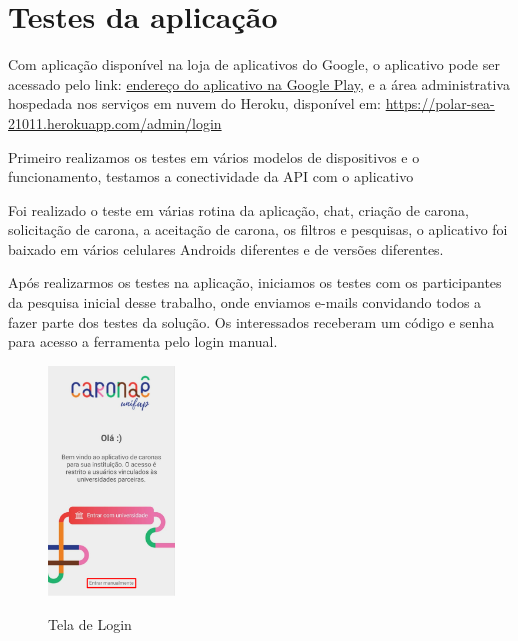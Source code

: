 
\section{Testes da aplicação}
Com aplicação disponível na loja de aplicativos do Google, o aplicativo pode ser acessado pelo link: \href{https://play.google.com/store/apps/details?id=com.unifap.caronaeunifap}{endereço do aplicativo na Google Play}, e a área administrativa hospedada nos serviços em nuvem do Heroku, disponível em: \href{https://polar-sea-21011.herokuapp.com/admin/login}{https://polar-sea-21011.herokuapp.com/admin/login}

Primeiro realizamos os testes em vários modelos de dispositivos e o funcionamento, testamos a conectividade da API com o aplicativo

Foi realizado o teste em várias rotina da aplicação, chat, criação de carona, solicitação de carona, a aceitação de carona, os filtros e pesquisas, o aplicativo foi baixado em vários celulares Androids diferentes e de versões diferentes.

Após realizarmos os testes na aplicação, iniciamos os testes com os participantes da pesquisa inicial desse trabalho, onde enviamos e-mails convidando todos a fazer parte dos testes da solução. Os interessados receberam um código e senha para acesso a ferramenta pelo login manual.

\begin{figure}[H]
	\centering
	\caption{Tela de Login}
	\includegraphics[width=0.3\textwidth]{./04-figuras/teLa_de_login.png}
	\label{fig:tela_inicial_caronae}
\end{figure}

